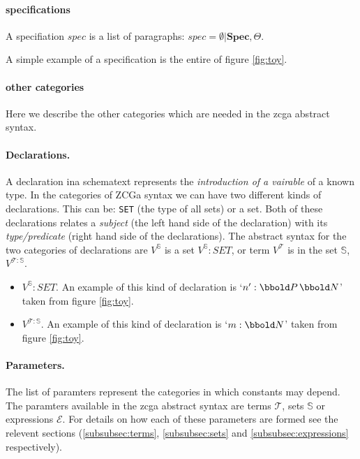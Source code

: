 \paragraph{specifications}
A specifiation $spec$ is a list of paragraphs: $spec= \emptyset \vert \mathbf{Spec}, \Theta$.

A simple example of a specification is the entire of figure \ref{fig:toy}.

\paragraph{other categories}

Here we describe the other categories which are needed in the \gls{zcga} abstract syntax.

\paragraph{Declarations.} A declaration ina schematext represents the \emph{introduction of a vairable} of a known type. In the categories of ZCGa syntax we can have two different kinds of declarations. This can be: \texttt{SET} (the type of all sets) or a set. Both of these declarations relates a \emph{subject} (the left hand side of the declaration) with its \emph{type/predicate} (right hand side of the declarations). The abstract syntax for the two categories of declarations are $V^{\mathbb{S}}$ is a set  $V^{\mathbb{S}}:SET$, or term $V^{\mathcal{T}}$ is in the set $\mathbb{S}$, $V^{\mathcal{T}:\mathbb{S}}$.

\begin{itemize}
\item$V^{\mathbb{S}}:SET$. An example of this kind of declaration is `$n':\power \nat$' taken from figure \ref{fig:toy}.

\item $V^{\mathcal{T}:\mathbb{S}}$. An example of this kind of declaration is `$m:\nat$' taken from figure \ref{fig:toy}.
\end{itemize}

\paragraph{Parameters.} The list of paramters represent the categories in which constants may depend. The paramters available in the \gls{zcga} abstract syntax are terms $\mathcal{T}$, sets $\mathbb{S}$ or expressions $\mathcal{E}$. For details on how each of these parameters are formed see the relevent sections (\ref{subsubsec:terms}, \ref{subsubsec:sets} and \ref{subsubsec:expressions} respectively).

